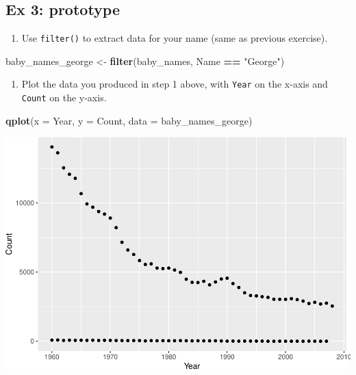 \documentclass[]{book}
\newenvironment{Shaded}{\begin{snugshade}}{\end{snugshade}}
\newcommand{\KeywordTok}[1]{\textcolor[rgb]{0.13,0.29,0.53}{\textbf{#1}}}
\newcommand{\DataTypeTok}[1]{\textcolor[rgb]{0.13,0.29,0.53}{#1}}
\newcommand{\StringTok}[1]{\textcolor[rgb]{0.31,0.60,0.02}{#1}}
\newcommand{\OperatorTok}[1]{\textcolor[rgb]{0.81,0.36,0.00}{\textbf{#1}}}
\newcommand{\NormalTok}[1]{#1}
\providecommand{\tightlist}{%
  \setlength{\itemsep}{0pt}\setlength{\parskip}{0pt}}
\begin{document}
\subsection{Ex 3: prototype}\label{ex-3-prototype}

\begin{enumerate}
\def\labelenumi{\arabic{enumi}.}
\tightlist
\item
  Use \texttt{filter()} to extract data for your name (same as previous
  exercise).
\end{enumerate}

\begin{Shaded}
\begin{Highlighting}[]
\NormalTok{baby_names_george <-}\StringTok{ }\KeywordTok{filter}\NormalTok{(baby_names, Name }\OperatorTok{==}\StringTok{ "George"}\NormalTok{)}
\end{Highlighting}
\end{Shaded}

\begin{enumerate}
\def\labelenumi{\arabic{enumi}.}
\setcounter{enumi}{1}
\tightlist
\item
  Plot the data you produced in step 1 above, with \texttt{Year} on the
  x-axis and \texttt{Count} on the y-axis.
\end{enumerate}

\begin{Shaded}
\begin{Highlighting}[]
\KeywordTok{qplot}\NormalTok{(}\DataTypeTok{x =}\NormalTok{ Year, }\DataTypeTok{y =}\NormalTok{ Count, }\DataTypeTok{data =}\NormalTok{ baby_names_george)}
\end{Highlighting}
\end{Shaded}

\includegraphics{R/Rintro/figures/unnamed-chunk-69-1.pdf}
\end{document}
